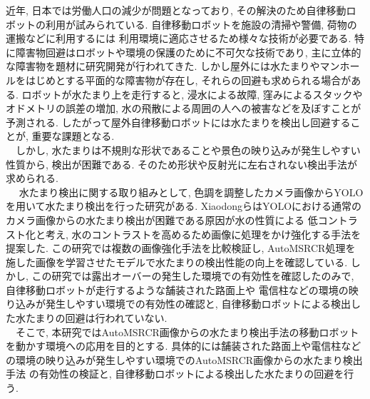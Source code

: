 \documentclass[10pt]{jarticle}
\begin{document}
    近年, 日本では労働人口の減少が問題となっており, 
    その解決のため自律移動ロボットの利用が試みられている. 
    自律移動ロボットを施設の清掃や警備, 荷物の運搬などに利用するには
    利用環境に適応させるため様々な技術が必要である. 
    特に障害物回避はロボットや環境の保護のために不可欠な技術であり, 
    主に立体的な障害物を題材に研究開発が行われてきた. 
    しかし屋外には水たまりやマンホールをはじめとする平面的な障害物が存在し, 
    それらの回避も求められる場合がある. ロボットが水たまり上を走行すると, 
    浸水による故障, 窪みによるスタックやオドメトリの誤差の増加, 
    水の飛散による周囲の人への被害などを及ぼすことが予測される. 
    したがって屋外自律移動ロボットには水たまりを検出し回避することが, 
    重要な課題となる.\\ 
    　しかし, 水たまりは不規則な形状であることや景色の映り込みが発生しやすい性質から, 
    検出が困難である. そのため形状や反射光に左右されない検出手法が求められる.\\
    　 水たまり検出に関する取り組みとして, 
    色調を調整したカメラ画像からYOLOを用いて水たまり検出を行った研究がある. 
    XiaodongらはYOLOにおける通常のカメラ画像からの水たまり検出が困難である原因が水の性質による
    低コントラスト化と考え, 水のコントラストを高めるため画像に処理をかけ強化する手法を提案した. 
    この研究では複数の画像強化手法を比較検証し, 
    AutoMSRCR処理を施した画像を学習させたモデルで水たまりの検出性能の向上を確認している. 
    しかし, この研究では露出オーバーの発生した環境での有効性を確認したのみで, 
    自律移動ロボットが走行するような舗装された路面上や
    電信柱などの環境の映り込みが発生しやすい環境での有効性の確認と, 
    自律移動ロボットによる検出した水たまりの回避は行われていない. \\
    　そこで, 本研究ではAutoMSRCR画像からの水たまり検出手法の移動ロボットを動かす環境への応用を目的とする. 
    具体的には舗装された路面上や電信柱などの環境の映り込みが発生しやすい環境でのAutoMSRCR画像からの水たまり検出手法
    の有効性の検証と, 自律移動ロボットによる検出した水たまりの回避を行う.





    



    
    
\end{document}
